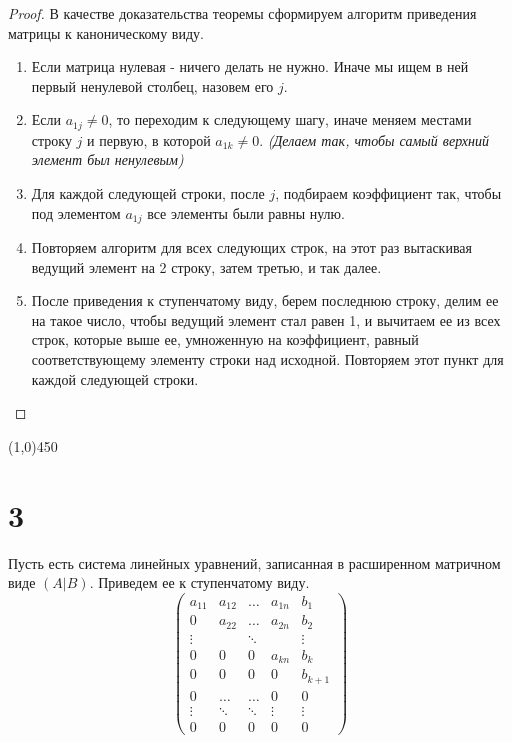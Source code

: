 \documentclass[a4paper,12pt]{article}
\begin{document}
	\begin{proof}
		В качестве доказательства теоремы сформируем алгоритм приведения матрицы к каноническому виду.
		\begin{enumerate}
			\item Если матрица нулевая - ничего делать не нужно. Иначе мы ищем в ней первый ненулевой столбец, назовем его $j$.
			\item Если $a_{1j} \neq 0$, то переходим к следующему шагу, иначе меняем местами строку $j$ и первую, в которой $a_{1k} \neq 0$. \textit{(Делаем так, чтобы самый верхний элемент был ненулевым)}
			\item Для каждой следующей строки, после $j$, подбираем коэффициент так, чтобы под элементом $a_{1j}$ все элементы были равны нулю.
			\item Повторяем алгоритм для всех следующих строк, на этот раз вытаскивая ведущий элемент на 2 строку, затем третью, и так далее.
			\item После приведения к ступенчатому виду, берем последнюю строку, делим ее на такое число, чтобы ведущий элемент стал равен 1, и вычитаем ее из всех строк, которые выше ее, умноженную на коэффициент, равный соответствующему элементу строки над исходной. Повторяем этот пункт для каждой следующей строки.
		\end{enumerate}
	\end{proof}
	
	
	\begin{center}
		\line(1,0){450}
	\end{center}

	\section*{3}
	Пусть есть система линейных уравнений, записанная в расширенном матричном виде $(A|B)$. Приведем ее к ступенчатому виду. 
	\[
	\left(
	\begin{array}{cccc|c}
	a_{11} & a_{12} & \ldots & a_{1n} & b_1 \\
	0      & a_{22} & \ldots & a_{2n} & b_2 \\
	\vdots &        & \ddots &        & \vdots \\
	0      & 0      & 0      & a_{kn} & b_k \\
	0      &  0     & 0      & 0      & b_{k + 1} \\
	0      &  \ldots& \ldots & 0      & 0\\
	\vdots & \ddots & \ddots & \vdots & \vdots\\
	0 & 0 & 0 & 0 & 0
	\end{array}
	\right)
	\]
	
\end{document}
